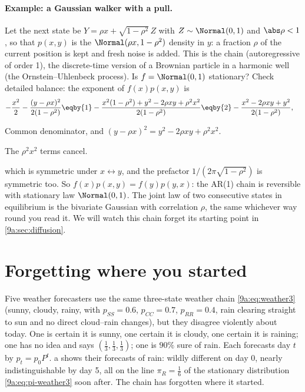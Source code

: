 \paragraph{Example: a Gaussian walker with a pull.}
Let the next state be $Y=\rho x+\sqrt{1-\rho^2}\,Z$ with $Z\sim\Normal(0,1)$ and $\abs\rho<1$,
so that $p(x,y)$ is the $\Normal(\rho x,1-\rho^2)$ density in $y$: a fraction $\rho$ of the
current position is kept and fresh noise is added. This is the  chain
(autoregressive of order 1), the discrete-time version of a Brownian particle in a harmonic
well (the Ornstein--Uhlenbeck process). Is $f=\Normal(0,1)$ stationary? Check detailed balance:
the exponent of $f(x)p(x,y)$ is
\begin{align*}
  -\frac{x^2}{2}-\frac{(y-\rho x)^2}{2(1-\rho^2)}
  &\eqby{1}-\frac{x^2(1-\rho^2)+y^2-2\rho xy+\rho^2x^2}{2(1-\rho^2)}
   \eqby{2}-\frac{x^2-2\rho xy+y^2}{2(1-\rho^2)} ,
\end{align*}
\begin{explain}
  \item Common denominator, and $(y-\rho x)^2=y^2-2\rho xy+\rho^2x^2$.
  \item The $\rho^2x^2$ terms cancel.
\end{explain}
which is symmetric under $x\leftrightarrow y$, and the prefactor
$1/(2\pi\sqrt{1-\rho^2})$ is symmetric too. So $f(x)p(x,y)=f(y)p(y,x)$: the AR(1) chain is
reversible with stationary law $\Normal(0,1)$. The joint law of two consecutive states in
equilibrium is the bivariate Gaussian with correlation $\rho$, the same whichever way round you
read it. We will watch this chain forget its starting point in \cref{9a:sec:diffusion}.
\section{Forgetting where you started}
\label{9a:sec:convergence}

Five weather forecasters use the same three-state weather chain \eqref{9a:eq:weather3}
(sunny, cloudy, rainy, with $p_{SS}=0.6$, $p_{CC}=0.7$, $p_{RR}=0.4$, rain clearing straight to
sun and no direct cloud--rain changes), but they disagree violently about today. One is certain
it is sunny, one certain it is cloudy, one certain it is raining; one has no idea and
says $(\tfrac13,\tfrac13,\tfrac13)$; one is $90\%$ sure of rain. Each forecasts day $t$ by
$p_t=p_0P^t$. a shows their forecasts of rain: wildly different on day 0,
nearly indistinguishable by day 5, all on the line $\pi_R=\tfrac16$ of the stationary
distribution \eqref{9a:eq:pi-weather3} soon after. The chain has forgotten where it started.

